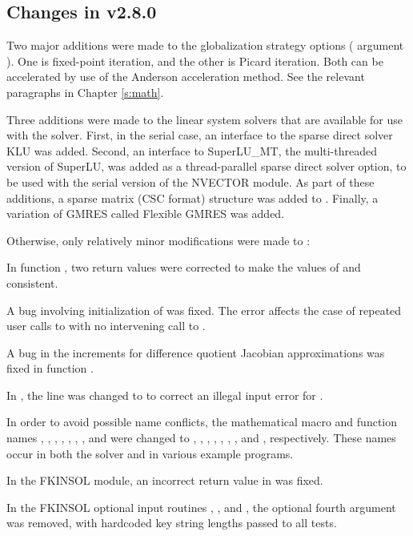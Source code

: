 \subsection*{Changes in v2.8.0}

Two major additions were made to the globalization strategy options
( argument ).  One is fixed-point iteration,
and the other is Picard iteration.  Both can be accelerated by use
of the Anderson acceleration method.  See the relevant paragraphs in
Chapter \ref{s:math}.

Three additions were made to the linear system solvers that are
available for use with the {\kinsol} solver.  First, in the serial case,
an interface to the sparse direct solver KLU was added.
Second, an interface to SuperLU\_MT, the multi-threaded version of
SuperLU, was added as a thread-parallel sparse direct solver option,
to be used with the serial version of the NVECTOR module.
As part of these additions, a sparse matrix (CSC format) structure
was added to {\kinsol}.  Finally, a variation of GMRES called
Flexible GMRES was added.

Otherwise, only relatively minor modifications were made to {\kinsol}:

In function , two return values were corrected to make the values
of  and  consistent.

A bug involving initialization of  was fixed.
The error affects the case of repeated user calls to  with no
intervening call to .

A bug in the increments for difference quotient Jacobian approximations
was fixed in function .

In , the line  was changed to
 to correct an illegal input error for .

In order to avoid possible name conflicts, the mathematical macro
and function names , , , , ,
, , and  were changed to
, , , , ,
, , and , respectively.
These names occur in both the solver and in various example programs.

In the FKINSOL module, an incorrect return value  in 
was fixed.

In the FKINSOL optional input routines , , and
, the optional fourth argument  was removed,
with hardcoded key string lengths passed to all  tests.

